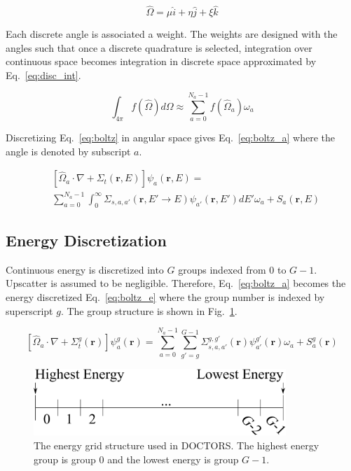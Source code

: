 \begin{equation} \label{eq:omega_cos}
	\hat{\Omega} = \mu \hat{i} + \eta \hat{j} + \xi \hat{k}
\end{equation}

Each discrete angle is associated a weight. The weights are designed with the angles such that once a discrete quadrature is selected, integration over continuous space becomes integration in discrete space approximated by Eq.~\ref{eq:disc_int}.

\begin{equation} \label{eq:disc_int}
\int_{4 \pi} f(\hat{\Omega}) d\Omega \approx \sum_{a=0}^{N_a-1} f(\hat{\Omega}_a) \omega_a
\end{equation}

Discretizing Eq.~\ref{eq:boltz} in angular space gives Eq.~\ref{eq:boltz_a} where the angle is denoted by subscript $a$.

\begin{equation} \label{eq:boltz_a}
\begin{split}
&\left[ \hat{\Omega}_a \cdot \nabla + \Sigma_t(\boldsymbol{r}, E) \right]
\psi_{a}(\boldsymbol{r}, E) = \\
&\sum_{a=0}^{N_a-1} \int_0^\infty \Sigma_{s, a, a'}(\boldsymbol{r}, E' \rightarrow E) \psi_{a'}(\boldsymbol{r}, E') dE' \omega_a + S_a(\boldsymbol{r}, E)
\end{split}
\end{equation}

\subsection{Energy Discretization}

Continuous energy is discretized into $G$ groups indexed from 0 to $G-1$. Upscatter is assumed to be negligible. Therefore, Eq.~\ref{eq:boltz_a} becomes the energy discretized Eq.~\ref{eq:boltz_e} where the group number is indexed by superscript $g$. The group structure is shown in Fig.~\ref{fig:energy_groups}.

\begin{equation} \label{eq:boltz_e}
\left[ \hat{\Omega}_a \cdot \nabla + \Sigma_t^g(\boldsymbol{r}) \right]
\psi_{a}^{g}(\boldsymbol{r}) = 
\sum_{a=0}^{N_a-1} \sum_{g'=g}^{G-1} \Sigma_{s, a, a'}^{g, g'}(\boldsymbol{r}) \psi_{a'}^{g'}(\boldsymbol{r}) \omega_a + S_a^g(\boldsymbol{r})
\end{equation}

\begin{figure}[tb]
  \begin{center}
   \includegraphics[width=3.75in]{figs/energy_groups}
  \end{center}
  \caption{The energy grid structure used in DOCTORS. The highest energy group is group 0 and the lowest energy is group $G-1$.}
\label{fig:energy_groups}
\end{figure}

